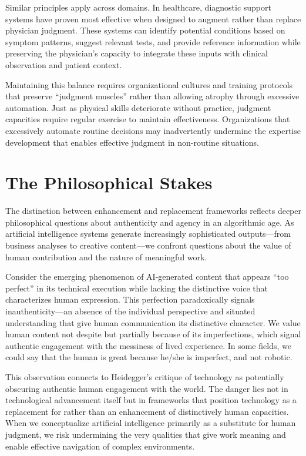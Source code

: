 \documentclass[
  Letterpaper,
]{scrbook}
\begin{document}
Similar principles apply across domains. In healthcare, diagnostic
support systems have proven most effective when designed to augment
rather than replace physician judgment. These systems can identify
potential conditions based on symptom patterns, suggest relevant tests,
and provide reference information while preserving the physician's
capacity to integrate these inputs with clinical observation and patient
context.

Maintaining this balance requires organizational cultures and training
protocols that preserve ``judgment muscles'' rather than allowing
atrophy through excessive automation. Just as physical skills
deteriorate without practice, judgment capacities require regular
exercise to maintain effectiveness. Organizations that excessively
automate routine decisions may inadvertently undermine the expertise
development that enables effective judgment in non-routine situations.

\section{The Philosophical Stakes}\label{the-philosophical-stakes}

The distinction between enhancement and replacement frameworks reflects
deeper philosophical questions about authenticity and agency in an
algorithmic age. As artificial intelligence systems generate
increasingly sophisticated outputs---from business analyses to creative
content---we confront questions about the value of human contribution
and the nature of meaningful work.

Consider the emerging phenomenon of AI-generated content that appears
``too perfect'' in its technical execution while lacking the distinctive
voice that characterizes human expression. This perfection paradoxically
signals inauthenticity---an absence of the individual perspective and
situated understanding that give human communication its distinctive
character. We value human content not despite but partially because of
its imperfections, which signal authentic engagement with the messiness
of lived experience. In some fields, we could say that the human is
great because he/she is imperfect, and not robotic.

This observation connects to Heidegger's critique of technology as
potentially obscuring authentic human engagement with the world. The
danger lies not in technological advancement itself but in frameworks
that position technology as a replacement for rather than an enhancement
of distinctively human capacities. When we conceptualize artificial
intelligence primarily as a substitute for human judgment, we risk
undermining the very qualities that give work meaning and enable
effective navigation of complex environments.
\end{document}
